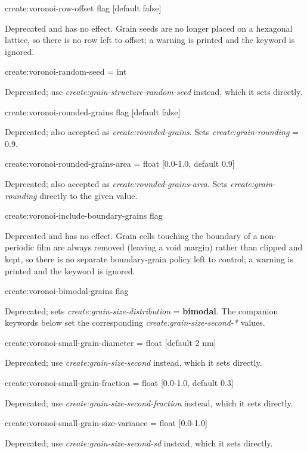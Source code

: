 {\zicf create:voronoi-row-offset flag [default false]} Deprecated and has no effect. Grain seeds are no longer placed on a hexagonal lattice, so there is no row left to offset; a warning is printed and the keyword is ignored.

{\zicf create:voronoi-random-seed = int} Deprecated; use \textit{create:grain-structure-random-seed} instead, which it sets directly.

{\zicf create:voronoi-rounded-grains flag [default false]} Deprecated; also accepted as \textit{create:rounded-grains}. Sets \textit{create:grain-rounding} = 0.9.

{\zicf create:voronoi-rounded-grains-area = float [0.0-1.0, default 0.9]} Deprecated; also accepted as \textit{create:rounded-grains-area}. Sets \textit{create:grain-rounding} directly to the given value.

{\zicf create:voronoi-include-boundary-grains flag} Deprecated and has no effect. Grain cells touching the boundary of a non-periodic film are always removed (leaving a void margin) rather than clipped and kept, so there is no separate boundary-grain policy left to control; a warning is printed and the keyword is ignored.

{\zicf create:voronoi-bimodal-grains flag} Deprecated; sets \textit{create:grain-size-distribution} = \textbf{bimodal}. The companion keywords below set the corresponding \textit{create:grain-size-second-*} values.

{\zicf create:voronoi-small-grain-diameter = float [default 2 nm]} Deprecated; use \textit{create:grain-size-second} instead, which it sets directly.

{\zicf create:voronoi-small-grain-fraction = float [0.0-1.0, default 0.3]} Deprecated; use \textit{create:grain-size-second-fraction} instead, which it sets directly.

{\zicf create:voronoi-small-grain-size-variance = float [0.0-1.0]} Deprecated; use \textit{create:grain-size-second-sd} instead, which it sets directly.

